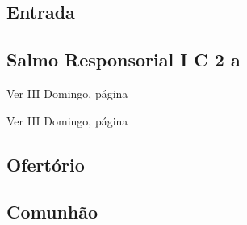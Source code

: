 
\subsection{Entrada}\label{subsection:proprium-sanctorum/in-transfiguratione-domini/psalmi-ad-introitum}

\AllowPageFlush

\subsection[Salmo Responsorial I]{Salmo Responsorial I \textmd{C 2 a}}\label{subsection:proprium-sanctorum/in-transfiguratione-domini/psalmus-responsorius}

\AllowPageFlush

\begin{rubrica}
  Ver III Domingo, página~\pageref{subsection:tempus-quadragesimae/dominica-1/psalmus-responsorius-2}
\end{rubrica}

\begin{rubrica}
  Ver III Domingo, página~\pageref{subsection:tempus-quadragesimae/dominica-1/antiphona-acclamationis}
\end{rubrica}


\subsection{Ofertório}\label{subsection:proprium-sanctorum/in-transfiguratione-domini/psalmi-ad-offertorium}

\AllowPageFlush

\subsection{Comunhão}\label{subsection:proprium-sanctorum/in-transfiguratione-domini/psalmi-ad-communionem}
